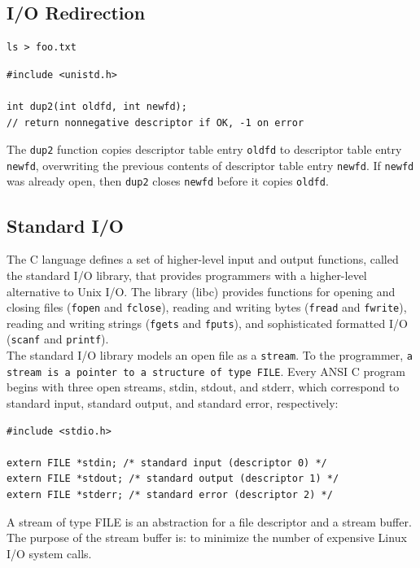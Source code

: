 \documentclass[11pt]{article}
\begin{document}
\subsection{I/O Redirection}
\label{sec:org99640cd}
\begin{verbatim}
ls > foo.txt
\end{verbatim}

\begin{verbatim}
#include <unistd.h>

int dup2(int oldfd, int newfd);
// return nonnegative descriptor if OK, -1 on error
\end{verbatim}


The \texttt{dup2} function copies descriptor table entry \texttt{oldfd} to descriptor table entry \texttt{newfd}, overwriting the previous contents of descriptor table entry \texttt{newfd}. If \texttt{newfd} was already open, then \texttt{dup2} closes \texttt{newfd} before it copies \texttt{oldfd}.\\

\subsection{Standard I/O}
\label{sec:orgcf167c0}
The C language defines a set of higher-level input and output functions, called the standard I/O library, that provides programmers with a higher-level alternative to Unix I/O. The library (libc) provides functions for opening and closing files (\texttt{fopen} and \texttt{fclose}), reading and writing bytes (\texttt{fread} and \texttt{fwrite}), reading and writing strings (\texttt{fgets} and \texttt{fputs}), and sophisticated formatted I/O (\texttt{scanf} and \texttt{printf}).\\

The standard I/O library models an open file as a \texttt{stream}. To the programmer, \texttt{a stream is a pointer to a structure of type FILE}. Every ANSI C program begins with three open streams, stdin, stdout, and stderr, which correspond to standard input, standard output, and standard error, respectively:\\
\begin{verbatim}
#include <stdio.h>

extern FILE *stdin; /* standard input (descriptor 0) */
extern FILE *stdout; /* standard output (descriptor 1) */
extern FILE *stderr; /* standard error (descriptor 2) */
\end{verbatim}

A stream of type FILE is an abstraction for a file descriptor and a stream buffer. The purpose of the stream buffer is: to minimize the number of expensive Linux I/O system calls.\\
\end{document}
